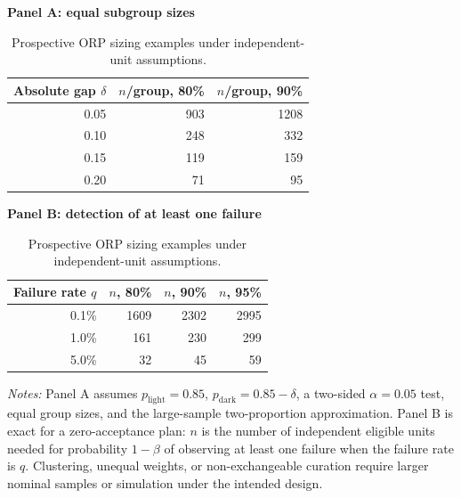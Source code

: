 \begin{table}[h!]
\centering
\small
\caption{Prospective ORP sizing examples under independent-unit assumptions.}
\label{tab:app-orp-prospective-sizing}
\begin{minipage}[t]{0.47\textwidth}
\centering
\textbf{Panel A: equal subgroup sizes}\par\vspace{2pt}
\scriptsize
\begin{tabular}{@{}rrr@{}}
\toprule
\textbf{Absolute gap $\delta$} & \textbf{$n$/group, 80\%} & \textbf{$n$/group, 90\%} \\
\midrule
0.05 & 903 & 1208 \\
0.10 & 248 & 332 \\
0.15 & 119 & 159 \\
0.20 & 71 & 95 \\
\bottomrule
\end{tabular}
\end{minipage}
\hfill
\begin{minipage}[t]{0.47\textwidth}
\centering
\textbf{Panel B: detection of at least one failure}\par\vspace{2pt}
\scriptsize
\begin{tabular}{@{}rrrr@{}}
\toprule
\textbf{Failure rate $q$} & \textbf{$n$, 80\%} & \textbf{$n$, 90\%} & \textbf{$n$, 95\%} \\
\midrule
0.1\% & 1609 & 2302 & 2995 \\
1.0\% & 161 & 230 & 299 \\
5.0\% & 32 & 45 & 59 \\
\bottomrule
\end{tabular}
\end{minipage}

\vspace{4pt}
\parbox{0.98\textwidth}{\footnotesize
\textit{Notes:} Panel A assumes $p_{\mathrm{light}}=0.85$,
$p_{\mathrm{dark}}=0.85-\delta$, a two-sided $\alpha=0.05$ test, equal group
sizes, and the large-sample two-proportion approximation. Panel B is exact for
a zero-acceptance plan: $n$ is the number of independent eligible units needed
for probability $1-\beta$ of observing at least one failure when the failure
rate is $q$. Clustering, unequal weights, or non-exchangeable curation require
larger nominal samples or simulation under the intended design.}
\end{table}
